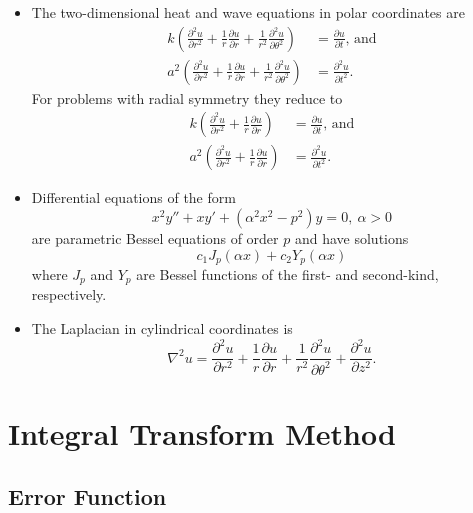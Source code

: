 \documentclass{article}
\begin{document}
\begin{itemize}
  \item The two-dimensional heat and wave equations in polar coordinates are \begin{align*}
          k \left( \frac{\partial^2 u}{\partial r^2} + \frac{1}{r} \frac{\partial u}{\partial r} + \frac{1}{r^2} \frac{\partial^2 u}{\partial \theta^2} \right)   & = \frac{\partial u}{\partial t} \text{, and} \\
          a^2 \left( \frac{\partial^2 u}{\partial r^2} + \frac{1}{r} \frac{\partial u}{\partial r} + \frac{1}{r^2} \frac{\partial^2 u}{\partial \theta^2} \right) & = \frac{\partial^2 u}{\partial t^2}.
        \end{align*} For problems with radial symmetry they reduce to \begin{align*}
          k \left( \frac{\partial^2 u}{\partial r^2} + \frac{1}{r} \frac{\partial u}{\partial r} \right)   & = \frac{\partial u}{\partial t} \text{, and} \\
          a^2 \left( \frac{\partial^2 u}{\partial r^2} + \frac{1}{r} \frac{\partial u}{\partial r} \right) & = \frac{\partial^2 u}{\partial t^2}.
        \end{align*}

  \item Differential equations of the form \[x^2 y'' + x y' + (\alpha^2 x^2 - p^2) y = 0,\ \alpha > 0\] are parametric Bessel equations of order $p$ and have solutions \[c_1 J_p(\alpha x) + c_2 Y_p(\alpha x)\] where $J_p$ and $Y_p$ are Bessel functions of the first- and second-kind, respectively.

  \item The Laplacian in cylindrical coordinates is \[\nabla^2 u = \frac{\partial^2 u}{\partial r^2} + \frac{1}{r} \frac{\partial u}{\partial r} + \frac{1}{r^2} \frac{\partial^2 u}{\partial \theta^2} + \frac{\partial^2 u}{\partial z^2}.\]
\end{itemize}

\section{Integral Transform Method}

\subsection{Error Function}
\end{document}
